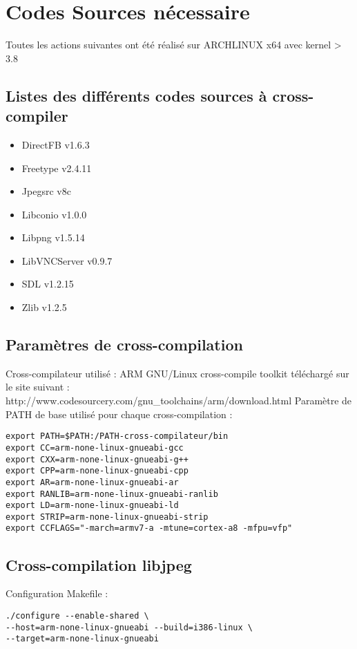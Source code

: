 \section {Codes Sources nécessaire}
Toutes les actions suivantes ont été réalisé sur ARCHLINUX x64 avec kernel > 3.8
\subsection{Listes des différents codes sources à cross-compiler}

\begin{itemize}
\item DirectFB v1.6.3
\item Freetype v2.4.11
\item Jpegsrc v8c
\item Libconio v1.0.0
\item Libpng v1.5.14
\item LibVNCServer v0.9.7
\item SDL v1.2.15
\item Zlib v1.2.5
\end{itemize}

\subsection{Paramètres de cross-compilation}
Cross-compilateur utilisé : ARM GNU/Linux cross-compile toolkit téléchargé sur le site suivant : http://www.codesourcery.com/gnu_toolchains/arm/download.html
Paramètre de PATH de base utilisé pour chaque cross-compilation :

\begin{lstlisting}
export PATH=$PATH:/PATH-cross-compilateur/bin
export CC=arm-none-linux-gnueabi-gcc
export CXX=arm-none-linux-gnueabi-g++
export CPP=arm-none-linux-gnueabi-cpp
export AR=arm-none-linux-gnueabi-ar
export RANLIB=arm-none-linux-gnueabi-ranlib
export LD=arm-none-linux-gnueabi-ld
export STRIP=arm-none-linux-gnueabi-strip
export CCFLAGS="-march=armv7-a -mtune=cortex-a8 -mfpu=vfp"
\end{lstlisting}

\subsection{Cross-compilation libjpeg}
Configuration Makefile :

\begin{lstlisting}
./configure --enable-shared \
--host=arm-none-linux-gnueabi --build=i386-linux \
--target=arm-none-linux-gnueabi
\end{lstlisting}

